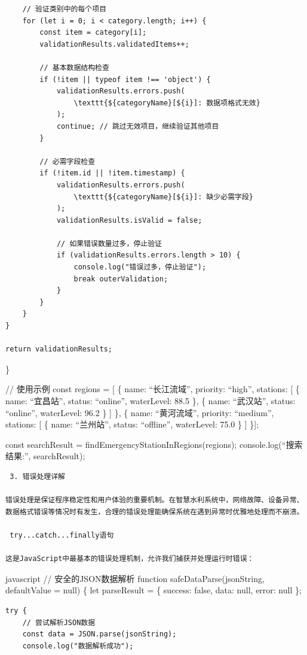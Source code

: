 {\begin{verbatim}
    // 验证类别中的每个项目
    for (let i = 0; i < category.length; i++) {
        const item = category[i];
        validationResults.validatedItems++;
        
        // 基本数据结构检查
        if (!item || typeof item !== 'object') {
            validationResults.errors.push(
                \texttt{${categoryName}[${i}]: 数据项格式无效}
            );
            continue; // 跳过无效项目，继续验证其他项目
        }
        
        // 必需字段检查
        if (!item.id || !item.timestamp) {
            validationResults.errors.push(
                \texttt{${categoryName}[${i}]: 缺少必需字段}
            );
            validationResults.isValid = false;
            
            // 如果错误数量过多，停止验证
            if (validationResults.errors.length > 10) {
                console.log("错误过多，停止验证");
                break outerValidation;
            }
        }
    }
}

return validationResults;
\end{verbatim}

\}

// 使用示例 const regions = {[} \{ name: ``长江流域'', priority: ``high'', stations: {[} \{ name: ``宜昌站'', status: ``online'', waterLevel: 88.5 \}, \{ name: ``武汉站'', status: ``online'', waterLevel: 96.2 \} {]} \}, \{ name: ``黄河流域'', priority: ``medium'', stations: {[} \{ name: ``兰州站'', status: ``offline'', waterLevel: 75.0 \} {]} \}{]};

const searchResult = findEmergencyStationInRegions(regions); console.log(``搜索结果:'', searchResult);

\begin{lstlisting}
 3. 错误处理详解

错误处理是保证程序稳定性和用户体验的重要机制。在智慧水利系统中，网络故障、设备异常、数据格式错误等情况时有发生，合理的错误处理能确保系统在遇到异常时优雅地处理而不崩溃。

 try...catch...finally语句

这是JavaScript中最基本的错误处理机制，允许我们捕获并处理运行时错误：
\end{lstlisting}

javascript // 安全的JSON数据解析 function safeDataParse(jsonString, defaultValue = null) \{ let parseResult = \{ success: false, data: null, error: null \};

\begin{verbatim}
try {
    // 尝试解析JSON数据
    const data = JSON.parse(jsonString);
    console.log("数据解析成功");
    

\end{verbatim}}
